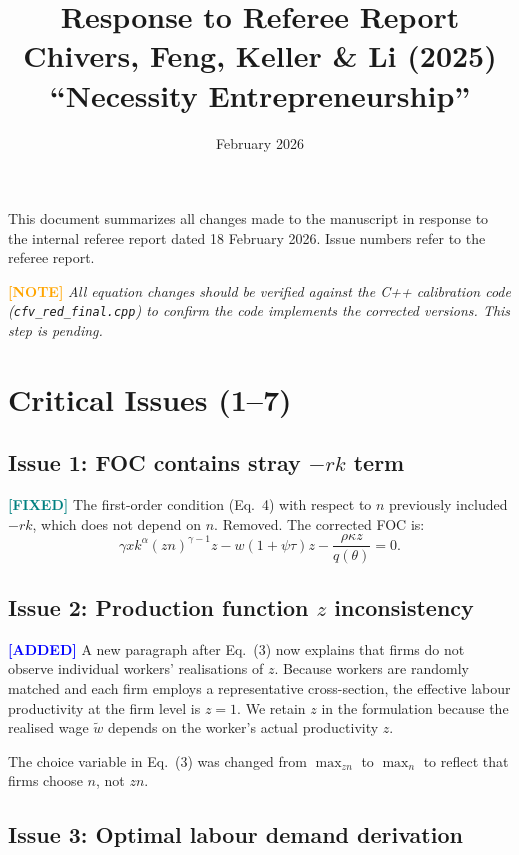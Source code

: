 \documentclass[11pt]{article}
\title{Response to Referee Report\\[6pt]\large Chivers, Feng, Keller \& Li (2025) ``Necessity Entrepreneurship''}
\author{}
\date{February 2026}
\newcommand{\fixed}{\textcolor{teal}{\textbf{[FIXED]}}}
\newcommand{\added}{\textcolor{blue}{\textbf{[ADDED]}}}
\newcommand{\noted}{\textcolor{orange}{\textbf{[NOTE]}}}
\begin{document}
\maketitle

\noindent This document summarizes all changes made to the manuscript in response to the internal referee report dated 18 February 2026. Issue numbers refer to the referee report.

\bigskip
\noindent\noted{} \textit{All equation changes should be verified against the C++ calibration code (\texttt{cfv\_red\_final.cpp}) to confirm the code implements the corrected versions. This step is pending.}

\section*{Critical Issues (1--7)}

\subsection*{Issue 1: FOC contains stray $-rk$ term}

\fixed{} The first-order condition (Eq.~4) with respect to $n$ previously included $-rk$, which does not depend on $n$. Removed. The corrected FOC is:
\[
\gamma x k^{\alpha}(zn)^{\gamma-1}z - w(1+\psi\tau)z - \frac{\rho\kappa z}{q(\theta)} = 0.
\]

\subsection*{Issue 2: Production function $z$ inconsistency}

\added{} A new paragraph after Eq.~(3) now explains that firms do not observe individual workers' realisations of $z$. Because workers are randomly matched and each firm employs a representative cross-section, the effective labour productivity at the firm level is $z=1$. We retain $z$ in the formulation because the realised wage $\widetilde{w}$ depends on the worker's actual productivity $z$.

The choice variable in Eq.~(3) was changed from $\max_{zn}$ to $\max_n$ to reflect that firms choose $n$, not $zn$.

\subsection*{Issue 3: Optimal labour demand derivation}
\end{document}
